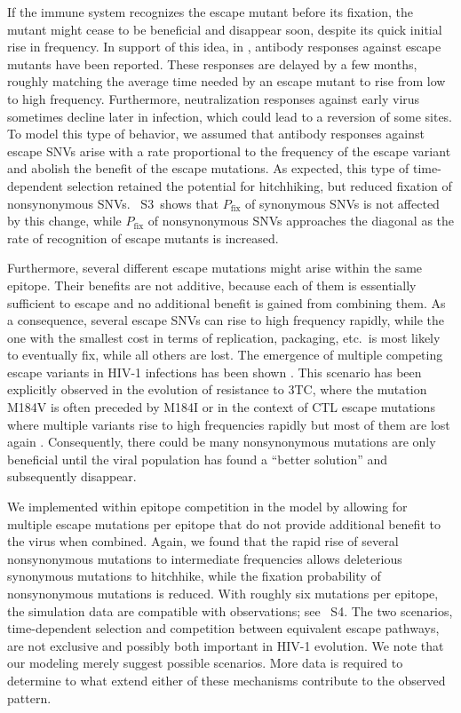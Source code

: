 \documentclass[11pt]{article}
\newcommand{\pfix}{P_{\mathrm{fix}}}
\newcommand{\timedependence}{3}
\newcommand{\withinepi}{4}
\begin{document}
If the immune system recognizes the escape mutant before its fixation,
the mutant might cease to be beneficial and disappear soon, despite its
quick initial rise in frequency. In support of this idea, in
\citet{richman_rapid_2003,wei_antibody_2003,bunnik_autologous_2008},
antibody responses against escape mutants have been reported. These
responses are delayed by a few months, roughly matching the average time
needed by an escape mutant to rise from low to high
frequency. Furthermore, neutralization responses against early virus
sometimes decline later in infection, which could lead to a reversion of
some sites. To model
this type of behavior, we assumed that antibody responses against escape
SNVs arise with a rate proportional to the frequency of the escape
variant and abolish the benefit of the escape mutations. As expected,
this type of time-dependent selection retained the potential for
hitchhiking, but reduced fixation of nonsynonymous SNVs.
\figurename~S\timedependence~shows that $\pfix$ of synonymous SNVs is
not affected by this change, while $\pfix$ of nonsynonymous SNVs
approaches the diagonal as the rate of recognition of escape mutants is
increased.

Furthermore, several different escape mutations might arise within the same epitope.
Their benefits are not additive, because each of
them is essentially sufficient to escape and no additional benefit is
gained from combining them. As a consequence, several escape SNVs can rise
to high frequency rapidly, while the one with the smallest cost in terms
of replication, packaging, etc.~is most likely to eventually fix, while
all others are lost. The emergence of multiple competing escape variants
in HIV-1 infections has been shown \citep{moore_limited_2009,
bar_early_2012,wei_antibody_2003}.  This scenario has been explicitly
observed in the evolution of resistance to 3TC, where the mutation M184V
is often preceded by M184I \citep{hedskog_dynamics_2010} or in the
context of CTL escape mutations where multiple variants rise to high
frequencies rapidly but most of them are lost again
\citep{fischer_transmission_2010}. Consequently, there could be many
nonsynonymous mutations are only beneficial until the viral population
has found a ``better solution'' and subsequently disappear. 

We implemented within epitope
competition in the model by allowing for multiple escape mutations per
epitope that do not provide additional benefit to the virus when
combined. Again, we found that the rapid rise of several nonsynonymous
mutations to intermediate frequencies allows deleterious synonymous
mutations to hitchhike, while the fixation probability of nonsynonymous
mutations is reduced. With roughly six mutations per epitope,
the simulation data are compatible with observations; see
\figurename~S\withinepi. The two scenarios, time-dependent selection and
competition between equivalent escape pathways, are not exclusive and
possibly both important in HIV-1 evolution. We note that our modeling merely suggest
possible scenarios. More data is required to determine to what extend
either of these mechanisms contribute to the observed pattern.
\end{document}
